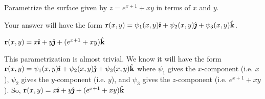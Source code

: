 

\subsection*{\Conceptual}
\begin{question}
Parametrize the surface given by $z=e^{x+1}+xy$ in terms of $x$ and $y$.
\end{question}
\begin{hint}
Your answer will have the form $\mathbf{r}(x,y)= \psi_1(x,y)\hat{\pmb{\imath}}+ \psi_2(x,y)\hat{\pmb{\jmath}}+ \psi_3(x,y)\hat{\mathbf{k}}$.
\end{hint}
\begin{answer}
 $\mathbf{r}(x,y)= x\hat{\pmb{\imath}}+ y\hat{\pmb{\jmath}}+ (e^{x+1}+xy)\hat{\mathbf{k}}$
\end{answer}
\begin{solution}
This parametrization is almost trivial. We know it will have the form $\mathbf{r}(x,y)= \psi_1(x,y)\hat{\pmb{\imath}}+ \psi_2(x,y)\hat{\pmb{\jmath}}+ \psi_3(x,y)\hat{\mathbf{k}}$ where $\psi_1$ gives the $x$-component (i.e. $x$), $\psi_2$ gives the $y$-component (i.e. $y$), and $\psi_3$ gives the $z$-component (i.e. $e^{x+1}+xy$). So,
 $\mathbf{r}(x,y)= x\hat{\pmb{\imath}}+ y\hat{\pmb{\jmath}}+ (e^{x+1}+xy)\hat{\mathbf{k}}$
\end{solution}
